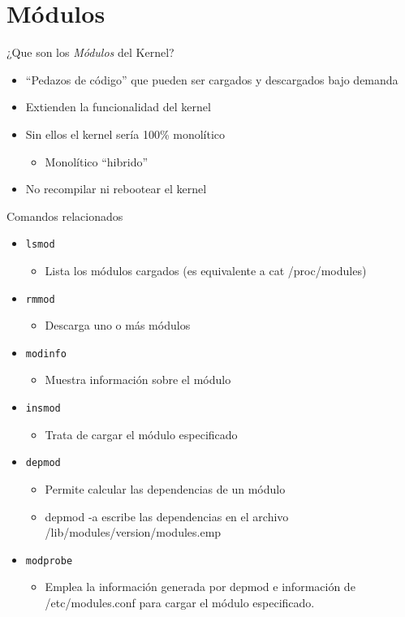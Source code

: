\section{Módulos}

\begin{frame}{¿Que son los \textit{Módulos} del Kernel?}
  \begin{itemize}
  \item “Pedazos de código” que pueden ser cargados y descargados bajo demanda 
  \item Extienden la funcionalidad del kernel
  \item Sin ellos el kernel sería 100\% monolítico   
  \begin{itemize}
    \item Monolítico ``hibrido''
  \end{itemize} 
 \item No recompilar ni rebootear el kernel
  \end{itemize}
\end{frame}

\begin{frame}{Comandos relacionados}
  \begin{itemize}
  \item \texttt{lsmod} 
  	\begin{itemize}
  	  \item Lista los módulos cargados (es equivalente a cat /proc/modules) 
  	\end{itemize} 
  \item \texttt{rmmod}
  	\begin{itemize}
  	  \item Descarga uno o más módulos 
  	\end{itemize} 
  \item \texttt{modinfo}   
	  \begin{itemize}
	    \item  Muestra información sobre el módulo 
	  \end{itemize} 
 \item \texttt{insmod}
	  \begin{itemize}
	    \item Trata de cargar el módulo especificado 
	  \end{itemize} 
 \item \texttt{depmod}
	  \begin{itemize}
	    \item Permite calcular las dependencias de un módulo
             \item depmod -a escribe las dependencias en el archivo /lib/modules/version/modules.emp  
	  \end{itemize} 
 \item \texttt{modprobe}    
 	\begin{itemize}
             \item Emplea la información generada por depmod e información de /etc/modules.conf 
             para cargar el módulo especificado. 
  	\end{itemize} 
  \end{itemize}

\end{frame}

